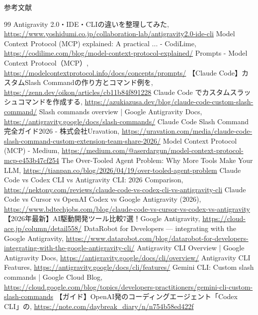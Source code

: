 \documentclass[aspectratio=169,11pt]{beamer}
\begin{document}
\appendix
\begin{frame}[allowframebreaks]{参考文献}
  \tiny
  \begin{thebibliography}{99}
     Antigravity 2.0・IDE・CLIの違いを整理してみた, \url{https://www.yoshidumi.co.jp/collaboration-lab/antigravity2.0-ide-cli}
     Model Context Protocol (MCP) explained: A practical ... - CodiLime, \url{https://codilime.com/blog/model-context-protocol-explained/}
     Prompts - Model Context Protocol（MCP）, \url{https://modelcontextprotocol.info/docs/concepts/prompts/}
     【Claude Code】カスタムSlash Commandの作り方とコマンド例を, \url{https://zenn.dev/oikon/articles/cb11b84f891228}
     Claude Code でカスタムスラッシュコマンドを作成する, \url{https://azukiazusa.dev/blog/claude-code-custom-slash-command/}
     Slash commands overview | Google Antigravity Docs, \url{https://antigravity.google/docs/slash-commands/}
     Claude Code Slash Command完全ガイド2026 - 株式会社Uravation, \url{https://uravation.com/media/claude-code-slash-command-custom-extension-team-share-2026/}
     Model Context Protocol (MCP) - Medium, \url{https://medium.com/@aserdargun/model-context-protocol-mcp-e453b47cf254}
     The Over-Tooled Agent Problem: Why More Tools Make Your LLM, \url{https://tianpan.co/blog/2026/04/19/over-tooled-agent-problem}
     Claude Code vs Codex CLI vs Antigravity CLI: 2026 Comparison, \url{https://nektony.com/reviews/claude-code-vs-codex-cli-vs-antigravity-cli}
     Claude Code vs Cursor vs OpenAI Codex vs Google Antigravity (2026), \url{https://www.bdtechjobs.com/blog/claude-code-vs-cursor-vs-codex-vs-antigravity}
     【2026年最新】AI駆動開発ツール比較7選！Google Antigravity, \url{https://cloud-ace.jp/column/detail558/}
     DataRobot for Developers --- integrating with the Google Antigravity, \url{https://www.datarobot.com/blog/datarobot-for-developers-integrating-with-the-google-antigravity-cli/}
     Antigravity CLI Overview | Google Antigravity Docs, \url{https://antigravity.google/docs/cli/overview/}
     Antigravity CLI Features, \url{https://antigravity.google/docs/cli/features/}
     Gemini CLI: Custom slash commands | Google Cloud Blog, \url{https://cloud.google.com/blog/topics/developers-practitioners/gemini-cli-custom-slash-commands}
     【ガイド】OpenAI発のコーディングエージェント「Codex CLI」の, \url{https://note.com/daybreak_diary/n/n754b58ed422f}

\end{thebibliography}
\end{frame}
\end{document}
